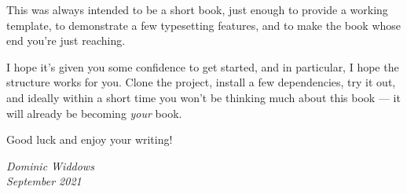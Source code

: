 This was always intended to be a short book, just enough to provide a working template, to demonstrate
a few typesetting features, and to make the book whose end you're just reaching.

I hope it's given you some confidence to get started, and in particular, I hope the structure works for you.
Clone the project, install a few dependencies, try it out, and ideally within a short time you won't be thinking
much about this book --- it will already be becoming {\em your} book.

Good luck and enjoy your writing!

\vspace{2cm}
\htbr 

\begin{flushright}
  {\em Dominic Widdows \\ September 2021}
\end{flushright}




